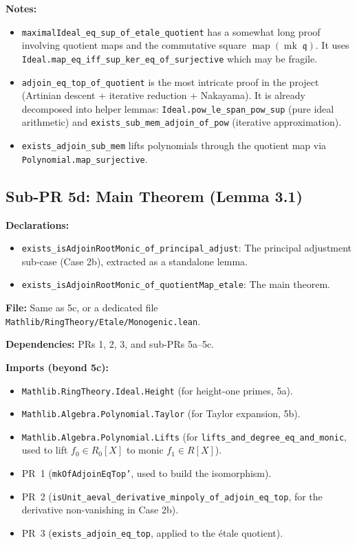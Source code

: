 \textbf{Notes:}
\begin{itemize}
  \item \texttt{maximalIdeal\_eq\_sup\_of\_}\allowbreak\texttt{etale\_quotient} has a somewhat
    long proof involving quotient maps and the commutative square
    $\operatorname{map}(\operatorname{mk}\;\mathfrak{q})$.
    It uses \texttt{Ideal.map\_eq\_iff\_sup\_ker\_}\allowbreak\texttt{eq\_of\_surjective}
    which may be fragile.
  \item \texttt{adjoin\_eq\_top\_of\_quotient} is the most intricate proof
    in the project (Artinian descent + iterative reduction + Nakayama).
    It is already decomposed into helper lemmas:
    \texttt{Ideal.pow\_le\_span\_pow\_sup} (pure ideal arithmetic)
    and \texttt{exists\_sub\_mem\_adjoin\_of\_pow} (iterative approximation).
  \item \texttt{exists\_adjoin\_sub\_mem} lifts polynomials through
    the quotient map via \texttt{Polynomial.map\_surjective}.
\end{itemize}

\subsection*{Sub-PR 5d: Main Theorem (Lemma 3.1)}

\textbf{Declarations:}
\begin{itemize}
  \item \texttt{exists\_isAdjoinRootMonic\_of\_principal\_adjust}:
    The principal adjustment sub-case (Case 2b), extracted as a
    standalone lemma.
  \item \texttt{exists\_isAdjoinRootMonic\_of\_quotientMap\_etale}:
    The main theorem.
\end{itemize}

\textbf{File:} Same as 5c, or a dedicated file
\texttt{Mathlib/RingTheory/Etale/Monogenic.lean}.

\textbf{Dependencies:} PRs 1, 2, 3, and sub-PRs 5a--5c.

\textbf{Imports (beyond 5c):}
\begin{itemize}
  \item \texttt{Mathlib.RingTheory.Ideal.Height} (for height-one primes, 5a).
  \item \texttt{Mathlib.Algebra.Polynomial.Taylor} (for Taylor expansion, 5b).
  \item \texttt{Mathlib.Algebra.Polynomial.Lifts}
    (for \texttt{lifts\_and\_degree\_eq\_and\_monic}, used to lift
     $f_0 \in R_0[X]$ to monic $f_1 \in R[X]$).
  \item PR~1 (\texttt{mkOfAdjoinEqTop'}, used to build the isomorphism).
  \item PR~2 (\texttt{isUnit\_aeval\_derivative\_minpoly\_of\_adjoin\_eq\_top}, for the
     derivative non-vanishing in Case 2b).
  \item PR~3 (\texttt{exists\_adjoin\_eq\_top}, applied to the étale quotient).
\end{itemize}

